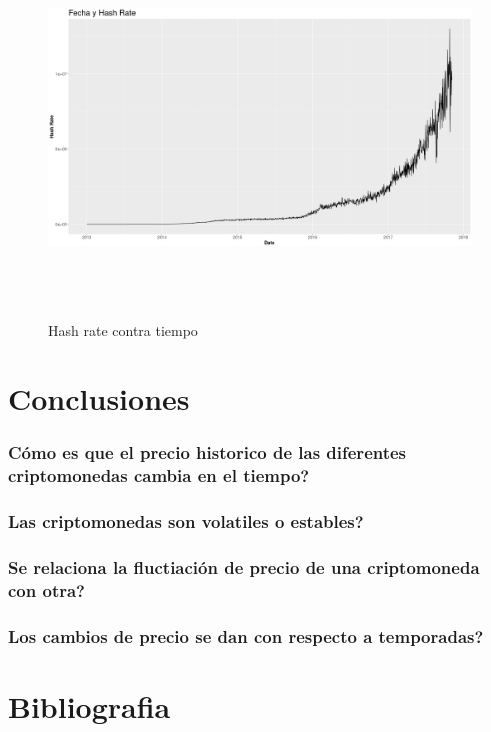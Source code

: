 \documentclass[12pt,letterpaper]{article}
\begin{document}
    \begin{figure}
        \centering

        \includegraphics[width = 18cm, height = 10cm]{btc/date_vs_hashRate}

        \caption{Hash rate contra tiempo}
    \end{figure}

\section{Conclusiones}

	\subsubsection*{C\'omo es que el precio historico de las diferentes criptomonedas cambia en el tiempo?}
	\subsubsection*{Las criptomonedas son volatiles o estables?}
	\subsubsection*{Se relaciona la fluctiaci\'on de precio de una criptomoneda con otra?}
	\subsubsection*{Los cambios de precio se dan con respecto a temporadas?}

	
\section{Bibliografia}
\end{document}
